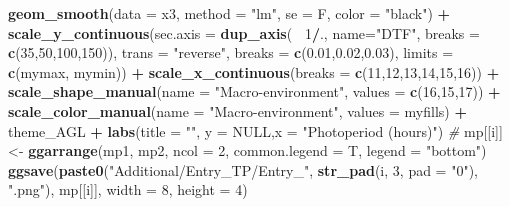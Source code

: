 \documentclass[
]{article}
\newenvironment{Shaded}{\begin{snugshade}}{\end{snugshade}}
\newcommand{\CommentTok}[1]{\textcolor[rgb]{0.56,0.35,0.01}{\textit{#1}}}
\newcommand{\DataTypeTok}[1]{\textcolor[rgb]{0.13,0.29,0.53}{#1}}
\newcommand{\DecValTok}[1]{\textcolor[rgb]{0.00,0.00,0.81}{#1}}
\newcommand{\FloatTok}[1]{\textcolor[rgb]{0.00,0.00,0.81}{#1}}
\newcommand{\KeywordTok}[1]{\textcolor[rgb]{0.13,0.29,0.53}{\textbf{#1}}}
\newcommand{\NormalTok}[1]{#1}
\newcommand{\OperatorTok}[1]{\textcolor[rgb]{0.81,0.36,0.00}{\textbf{#1}}}
\newcommand{\OtherTok}[1]{\textcolor[rgb]{0.56,0.35,0.01}{#1}}
\newcommand{\StringTok}[1]{\textcolor[rgb]{0.31,0.60,0.02}{#1}}
\begin{document}
\begin{Shaded}
\begin{Highlighting}[]
{{{{{\StringTok{    }\KeywordTok{geom_smooth}\NormalTok{(}\DataTypeTok{data =}\NormalTok{ x3, }\DataTypeTok{method =} \StringTok{"lm"}\NormalTok{, }\DataTypeTok{se =}\NormalTok{ F, }\DataTypeTok{color =} \StringTok{"black"}\NormalTok{) }\OperatorTok{+}
\StringTok{    }\KeywordTok{scale_y_continuous}\NormalTok{(}\DataTypeTok{sec.axis =} \KeywordTok{dup_axis}\NormalTok{(}\OperatorTok{~}\StringTok{ }\DecValTok{1}\OperatorTok{/}\NormalTok{., }\DataTypeTok{name=}\StringTok{"DTF"}\NormalTok{, }\DataTypeTok{breaks =} \KeywordTok{c}\NormalTok{(}\DecValTok{35}\NormalTok{,}\DecValTok{50}\NormalTok{,}\DecValTok{100}\NormalTok{,}\DecValTok{150}\NormalTok{)),}
                       \DataTypeTok{trans =} \StringTok{"reverse"}\NormalTok{, }\DataTypeTok{breaks =} \KeywordTok{c}\NormalTok{(}\FloatTok{0.01}\NormalTok{,}\FloatTok{0.02}\NormalTok{,}\FloatTok{0.03}\NormalTok{), }
                       \DataTypeTok{limits =} \KeywordTok{c}\NormalTok{(mymax, mymin)) }\OperatorTok{+}
\StringTok{    }\KeywordTok{scale_x_continuous}\NormalTok{(}\DataTypeTok{breaks =} \KeywordTok{c}\NormalTok{(}\DecValTok{11}\NormalTok{,}\DecValTok{12}\NormalTok{,}\DecValTok{13}\NormalTok{,}\DecValTok{14}\NormalTok{,}\DecValTok{15}\NormalTok{,}\DecValTok{16}\NormalTok{)) }\OperatorTok{+}
\StringTok{    }\KeywordTok{scale_shape_manual}\NormalTok{(}\DataTypeTok{name =} \StringTok{"Macro-environment"}\NormalTok{, }\DataTypeTok{values =} \KeywordTok{c}\NormalTok{(}\DecValTok{16}\NormalTok{,}\DecValTok{15}\NormalTok{,}\DecValTok{17}\NormalTok{)) }\OperatorTok{+}
\StringTok{    }\KeywordTok{scale_color_manual}\NormalTok{(}\DataTypeTok{name =} \StringTok{"Macro-environment"}\NormalTok{, }\DataTypeTok{values =}\NormalTok{ myfills) }\OperatorTok{+}
\StringTok{    }\NormalTok{theme_AGL }\OperatorTok{+}
\StringTok{    }\KeywordTok{labs}\NormalTok{(}\DataTypeTok{title =} \StringTok{""}\NormalTok{, }\DataTypeTok{y =} \OtherTok{NULL}\NormalTok{,}\DataTypeTok{x =} \StringTok{"Photoperiod (hours)"}\NormalTok{)}
  \CommentTok{#}
\NormalTok{  mp[[i]] <-}\StringTok{ }\KeywordTok{ggarrange}\NormalTok{(mp1, mp2, }\DataTypeTok{ncol =} \DecValTok{2}\NormalTok{, }\DataTypeTok{common.legend =}\NormalTok{ T, }\DataTypeTok{legend =} \StringTok{"bottom"}\NormalTok{) }
  \KeywordTok{ggsave}\NormalTok{(}\KeywordTok{paste0}\NormalTok{(}\StringTok{"Additional/Entry_TP/Entry_"}\NormalTok{, }\KeywordTok{str_pad}\NormalTok{(i, }\DecValTok{3}\NormalTok{, }\DataTypeTok{pad =} \StringTok{"0"}\NormalTok{), }\StringTok{".png"}\NormalTok{), }
\NormalTok{         mp[[i]], }\DataTypeTok{width =} \DecValTok{8}\NormalTok{, }\DataTypeTok{height =} \DecValTok{4}\NormalTok{)}
}}}}}
\end{Highlighting}
\end{Shaded}
\end{document}
